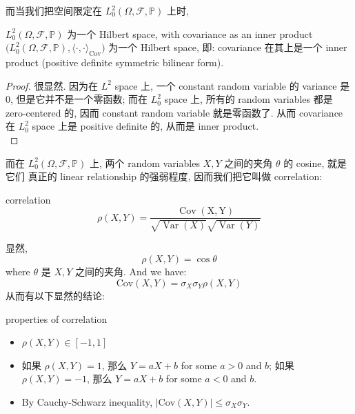 而当我们把空间限定在 $L^2_0(\Omega, \mathcal{F}, \mathbb{P})$ 上时, 
\begin{theorem}{$L^2_0(\Omega, \mathcal{F}, \mathbb{P})$ 为一个 Hilbert space, with covariance as an inner product}
    $\big(L^2_0(\Omega, \mathcal{F}, \mathbb{P}), \langle \cdot, \cdot \rangle_{\text{Cov}} \big)$ 为一个 Hilbert space,
    即: covariance 在其上是一个 inner product (positive definite symmetric bilinear form).
\end{theorem}
\begin{proof}
很显然. 因为在 $L^2$ space 上, 一个 constant random variable 的
variance 是 0, 但是它并不是一个零函数; 而在 $L^2_0$ space 上, 
所有的 random variables 都是 zero-centered 的,
因而 constant random variable 就是零函数了. 
从而 covariance 在 $L^2_0$ space 上是 positive definite 的, 从而是 inner product.\\
\end{proof}


而在 $L^2_0(\Omega, \mathcal{F}, \mathbb{P})$ 上, 
两个 random variables \(X, Y\) 之间的夹角 \(\theta\) 的 cosine, 就是它们
真正的 linear relationship 的强弱程度, 因而我们把它叫做 correlation:
\begin{definition}{correlation}\label{def:correlation}
$$
\rho(X, Y)=\frac{\operatorname{Cov}(\mathrm{X}, \mathrm{Y})}{\sqrt{\operatorname{Var}(X)} \sqrt{\operatorname{Var}(Y)}}
$$
\end{definition}
显然, \[
\rho(X, Y) = \cos \theta
\]
where \(\theta\) 是 \(X, Y\) 之间的夹角.
And we have: \[
\text{Cov}(X,Y) =  \sigma_X \sigma_Y \rho(X,Y)
\]
从而有以下显然的结论: 
\begin{proposition}{properties of correlation}
    \begin{itemize}
    \item \(\rho(X,Y) \in [-1,1]\)
    \item 如果 \(\rho(X,Y) = 1\), 那么 \(Y = aX + b\) for some \(a > 0\) and \(b\); 如果
     \(\rho(X,Y) = -1\), 那么 \(Y = aX + b\) for some \(a < 0\) and \(b\).\
    \item By Cauchy-Schwarz inequality, \(|\text{Cov}(X,Y)| \leq \sigma_X \sigma_Y\).
\end{itemize}
\end{proposition}

